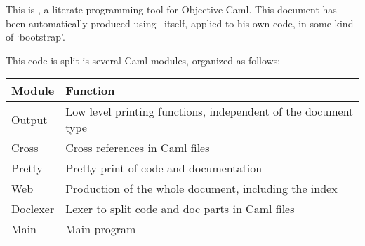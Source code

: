 
\newcommand{\ocaml}{\textsf{Objective Caml}}

\ocwsection
This is \ocamlweb, a literate programming tool for \ocaml.
This document has been automatically produced using \ocamlweb\ itself,
applied to his own code, in some kind of `bootstrap'.

This code is split is several Caml modules, organized as follows:

\begin{center}
\begin{tabular}{|l|l|}
  \hline
  \bf Module  &  \bf Function \\
  \hline\hline
  Output  &  Low level printing functions, independent of the document
  type \\
  \hline
  Cross   & Cross references in Caml files \\
  \hline
  Pretty  & Pretty-print of code and documentation \\
  \hline
  Web     & Production of the whole document, including the index \\
  \hline
  Doclexer& Lexer to split code and doc parts in Caml files \\
  \hline
  Main    & Main program \\
  \hline
\end{tabular}
\end{center}
